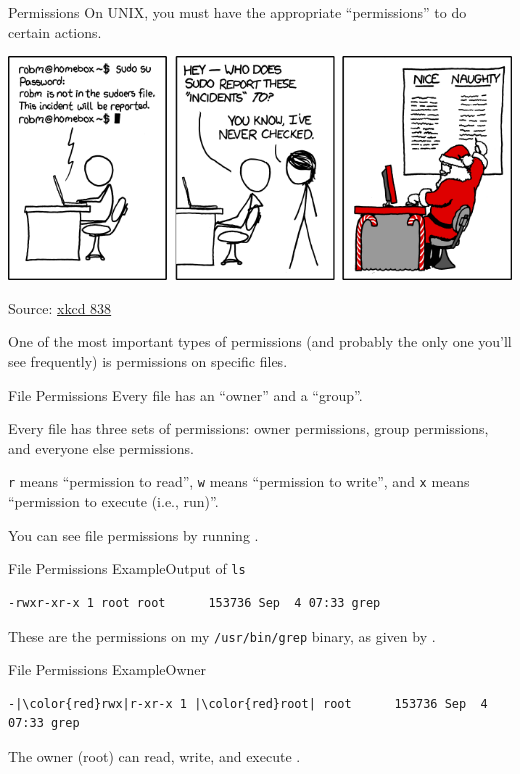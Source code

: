 \begin{frame}[c]{Permissions}
  On UNIX, you must have the appropriate \enquote{permissions} to do certain
  actions.

  \pause

  \begin{center}
    \includegraphics[width=0.7\paperwidth]{images/incident.png}
  \end{center}

  Source: \href{https://xkcd.com/838/}{xkcd 838}
\end{frame}

One of the most important types of permissions (and probably the only one
you'll see frequently) is permissions on specific files.

\begin{frame}{File Permissions}
  Every file has an \enquote{owner} and a \enquote{group}.
  \pause

  Every file has three sets of permissions: owner permissions, group
  permissions, and everyone else permissions.
  \pause

  \texttt{r} means \enquote{permission to read}, \texttt{w} means
  \enquote{permission to write}, and \texttt{x} means \enquote{permission to
  execute (i.e., run)}.
  \pause

  You can see file permissions by running .
\end{frame}

\begin{frame}[fragile]{File Permissions Example}{Output of \texttt{ls}}
  \begin{verbatim}
-rwxr-xr-x 1 root root      153736 Sep  4 07:33 grep
  \end{verbatim}

  These are the permissions on my \texttt{/usr/bin/grep} binary, as given by
  .
\end{frame}

\begin{frame}[fragile]{File Permissions Example}{Owner}
  \begin{verbatim}
-|\color{red}rwx|r-xr-x 1 |\color{red}root| root      153736 Sep  4 07:33 grep
  \end{verbatim}

  The owner (root) can read, write, and execute .
\end{frame}

